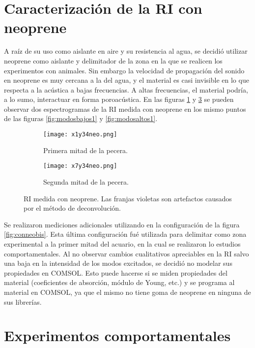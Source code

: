 \section{Caracterización de la RI con neoprene}

A raíz de su uso como aislante en aire y su resistencia al agua, se decidió utilizar neoprene como aislante y delimitador de la zona en la que se realicen los experimentos con animales. Sin embargo la velocidad de propagación del sonido en neoprene es muy cercana a la del agua, y el material es casi invisible en lo que respecta a la acústica a bajas frecuencias. A altas frecuencias, el material podría, a lo sumo, interactuar en forma poroacústica. En las figuras \ref{subfig:neoprene1} y \ref{subfig:neoprene2} se pueden observar dos espectrogramas de la RI medida con neoprene en los mismo puntos de las figuras \ref{fig:modosbajos1} y \ref{fig:modosaltos1}.

\begin{figure}[H]
	\begin{subfigure}[b]{\textwidth}
		\centering
		\texttt{[image: x1y34neo.png]}
		\caption{Primera mitad de la pecera.}
		\label{subfig:neoprene1}
	\end{subfigure}

	\begin{subfigure}[b]{\textwidth}
		\centering
		\texttt{[image: x7y34neo.png]}
		\caption{Segunda mitad de la pecera.}
		\label{subfig:neoprene2}
	\end{subfigure}
	\caption{RI medida con neoprene. Las franjas violetas son artefactos causados por el método de deconvolución.}
\end{figure}

Se realizaron mediciones adicionales utilizando en la configuración de la figura \ref{fig:conneobis}. Esta última configuración fué utilizada para delimitar como zona experimental a la primer mitad del acuario, en la cual se realizaron lo estudios comportamentales. Al no observar cambios cualitativos apreciables en la RI salvo una baja en la intensidad de los modos excitados, se decidió no modelar sus propiedades en COMSOL. Esto puede hacerse si se miden propiedades del material (coeficientes de absorción, módulo de Young, etc.) y se programa al material en COMSOL, ya que el mismo no tiene goma de neoprene en ninguna de sus librerías. 

\section{Experimentos comportamentales}


